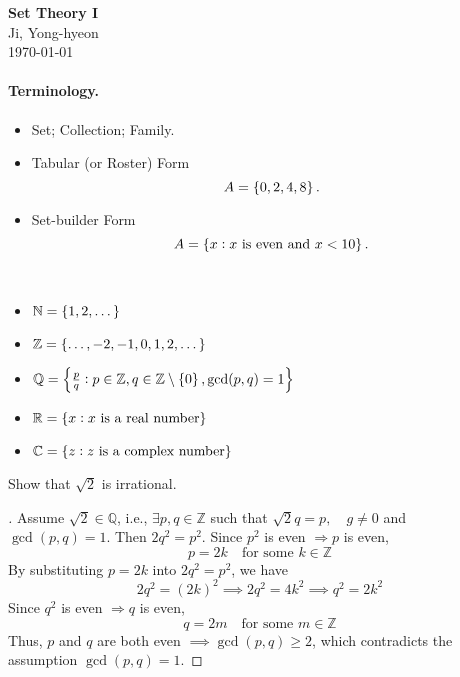 \documentclass[11pt,openany]{article}
\begin{document}
\begin{center}
	\huge\textbf{Set Theory I}\\
	\vspace{0.5em}
	\large{Ji, Yong-hyeon}\\
	\vspace{0.5em}
	\normalsize{\today}\\
\end{center}

\paragraph*{Terminology.}

\begin{itemize}
	\item Set; Collection; Family.
	\item Tabular (or Roster) Form \[
	A=\set{0,2,4,8}.
	\]
	\item Set-builder Form \[
	A=\set{x:x\ \text{is even and}\ x <10}.
	\]
\end{itemize}

\begin{example*}
	\ \begin{itemize}
		\item $\mathbb{N}=\set{1,2,\dots}$
		\item $\mathbb{Z}=\set{\dots,-2,-1,0,1,2,\dots}$
		\item $\mathbb{Q}=\set{\frac{p}{q}:p\in\mathbb{Z},q\in\mathbb{Z}\setminus\set{0}, \gcd(p,q)=1}$
		\item $\mathbb{R}=\set{x: x\ \text{is a real number}}$
		\item $\mathbb{C}=\set{z:z\ \text{is a complex number}}$
	\end{itemize}
\end{example*}
\vfill
\begin{exercise*}
	Show that $\sqrt{2}$ is irrational.
	\begin{proof}[\sol]
		\textcolor{gray!30!white}{Assume \( \sqrt{2} \in \mathbb{Q} \), i.e., \( \exists p, q \in \mathbb{Z} \) such that
		$\sqrt{2}q = p, \quad g\neq 0$ and $\gcd(p, q) = 1.$
		Then $2q^2 = p^2$. Since \( p^2 \) is even \( \Rightarrow p \) is even,
		\[
		p = 2k \quad \text{for some } k \in \mathbb{Z}
		\]
		By substituting \( p = 2k \) into \( 2q^2 = p^2 \), we have
		\[
		2q^2 = (2k)^2 \implies 2q^2 = 4k^2 \implies q^2 = 2k^2
		\]
		Since \( q^2 \) is even \( \Rightarrow q \) is even,
		\[
		q = 2m \quad \text{for some } m \in \mathbb{Z}
		\]
		Thus, \( p \) and \( q \) are both even \( \implies \gcd(p, q) \geq 2 \), which contradicts the assumption \( \gcd(p, q) = 1 \).}
	\end{proof}
\end{exercise*}
\end{document}
